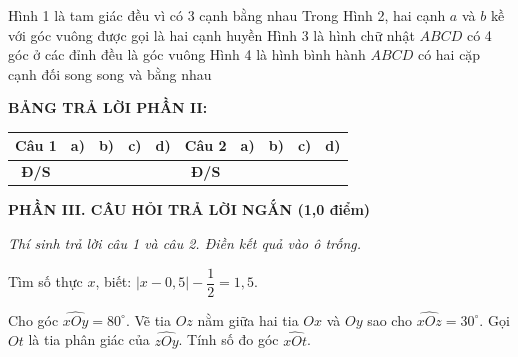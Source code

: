 \documentclass[12pt,a4paper]{article}
\begin{document}
\begin{ex}
\begin{center}
\end{center}
\choiceTF
{\True Hình 1 là tam giác đều vì có 3 cạnh bằng nhau}
{Trong Hình 2, hai cạnh $a$ và $b$ kề với góc vuông được gọi là hai cạnh huyền}
{\True Hình 3 là hình chữ nhật $ABCD$ có 4 góc ở các đỉnh đều là góc vuông}
{\True Hình 4 là hình bình hành $ABCD$ có hai cặp cạnh đối song song và bằng nhau}
\end{ex}


\noindent\textbf{BẢNG TRẢ LỜI PHẦN II:}
\begin{center}
\begin{tabular}{|c|c|c|c|c||c|c|c|c|c|}
\hline
\textbf{Câu 1} & \textbf{a)} & \textbf{b)} & \textbf{c)} & \textbf{d)} & \textbf{Câu 2} & \textbf{a)} & \textbf{b)} & \textbf{c)} & \textbf{d)} \\
\hline
\textbf{Đ/S} & \rule{0pt}{0.45cm} & & & & \textbf{Đ/S} & & & & \\
\hline
\end{tabular}
\end{center}
\vspace{1mm}

\setcounter{ex}{0}
\noindent\textbf{\large PHẦN III. CÂU HỎI TRẢ LỜI NGẮN (1,0 điểm)}

\textit{Thí sinh trả lời câu 1 và câu 2. Điền kết quả vào ô trống.}

\vspace{1mm}
\begin{ex}
Tìm số thực $x$, biết: $|x - 0{,}5| - \dfrac{1}{2} = 1{,}5$. 
\end{ex}

\begin{ex}
Cho góc $\widehat{xOy} = 80^\circ$. Vẽ tia $Oz$ nằm giữa hai tia $Ox$ và $Oy$ sao cho $\widehat{xOz} = 30^\circ$. Gọi $Ot$ là tia phân giác của $\widehat{zOy}$. Tính số đo góc $\widehat{xOt}$. 
\end{ex}
\end{document}
